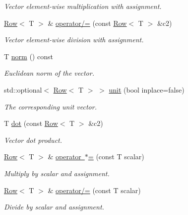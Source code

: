 \begin{DoxyCompactItemize}
\begin{DoxyCompactList}\small\item\em Vector element-\/wise multiplication with assignment. \end{DoxyCompactList}\item 
\mbox{\hyperlink{classtao_1_1_row}{Row}}$<$ T $>$ \& \mbox{\hyperlink{classtao_1_1_row_acc133027f920c93aa8e2e60f9fb2dab0}{operator/=}} (const \mbox{\hyperlink{classtao_1_1_row}{Row}}$<$ T $>$ \&c2)
\begin{DoxyCompactList}\small\item\em Vector element-\/wise division with assignment. \end{DoxyCompactList}\item 
T \mbox{\hyperlink{classtao_1_1_row_af88f032fa3e9ce20f1d16865cbc95c4f}{norm}} () const
\begin{DoxyCompactList}\small\item\em Euclidean norm of the vector. \end{DoxyCompactList}\item 
std\+::optional$<$ \mbox{\hyperlink{classtao_1_1_row}{Row}}$<$ T $>$ $>$ \mbox{\hyperlink{classtao_1_1_row_ae4516ba90753201b2941021dd398172a}{unit}} (bool inplace=false)
\begin{DoxyCompactList}\small\item\em The corresponding unit vector. \end{DoxyCompactList}\item 
T \mbox{\hyperlink{classtao_1_1_row_a2201154700bd38327cdedaaa2a39273f}{dot}} (const \mbox{\hyperlink{classtao_1_1_row}{Row}}$<$ T $>$ \&c2)
\begin{DoxyCompactList}\small\item\em Vector dot product. \end{DoxyCompactList}\item 
\mbox{\hyperlink{classtao_1_1_row}{Row}}$<$ T $>$ \& \mbox{\hyperlink{classtao_1_1_row_a7a46e0ed2c119a5baff222df3c565413}{operator $\ast$=}} (const T scalar)
\begin{DoxyCompactList}\small\item\em Multiply by scalar and assignment. \end{DoxyCompactList}\item 
\mbox{\hyperlink{classtao_1_1_row}{Row}}$<$ T $>$ \& \mbox{\hyperlink{classtao_1_1_row_a3af5bd67677890c474d495bf5578ff89}{operator/=}} (const T scalar)
\begin{DoxyCompactList}\small\item\em Divide by scalar and assignment. \end{DoxyCompactList}\end{DoxyCompactItemize}
